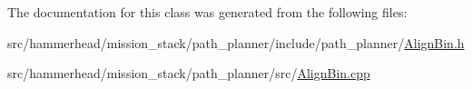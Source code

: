 The documentation for this class was generated from the following files\+:\begin{DoxyCompactItemize}
\item 
src/hammerhead/mission\+\_\+stack/path\+\_\+planner/include/path\+\_\+planner/\hyperlink{AlignBin_8h}{Align\+Bin.\+h}\item 
src/hammerhead/mission\+\_\+stack/path\+\_\+planner/src/\hyperlink{AlignBin_8cpp}{Align\+Bin.\+cpp}\end{DoxyCompactItemize}
